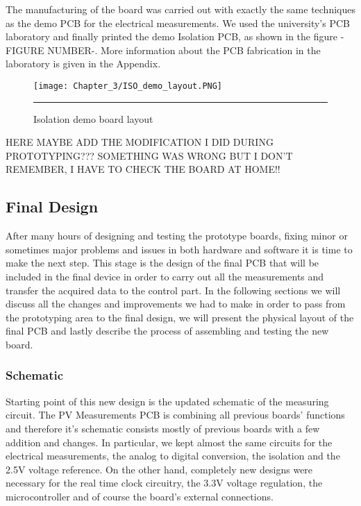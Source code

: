 The manufacturing of the board was carried out with exactly the same techniques as the demo PCB for the electrical measurements. We used the university's PCB laboratory and finally printed the demo Isolation PCB, as shown in the figure -FIGURE NUMBER-. More information about the PCB fabrication in the laboratory is given in the Appendix.\\

\begin{figure}[htbp]
	\centering
		\texttt{[image: Chapter\_3/ISO\_demo\_layout.PNG]}
		\rule{35em}{0.5pt}
	\caption{Isolation demo board layout}
	\label{fig:ISO_demo_layo}
\end{figure}

HERE MAYBE ADD THE MODIFICATION I DID DURING PROTOTYPING???
SOMETHING WAS WRONG BUT I DON'T REMEMBER, I HAVE TO CHECK THE BOARD AT HOME!!


\subsection{Final Design}
After many hours of designing and testing the prototype boards, fixing minor or sometimes major problems and issues in both hardware and software it is time to make the next step. This stage is the design of the final PCB that will be included in the final device in order to carry out all the measurements and transfer the acquired data to the control part. In the following sections we will discuss all the changes and improvements we had to make in order to pass from the prototyping area to the final design, we will present the physical layout of the final PCB and lastly describe the process of assembling and testing the new board.


\subsubsection{Schematic}
Starting point of this new design is the updated schematic of the measuring circuit. The PV Measurements PCB is combining all previous boards' functions and therefore it's schematic consists mostly of previous boards with a few addition and changes. In particular, we kept almost the same circuits for the electrical measurements, the analog to digital conversion, the isolation and the 2.5V voltage reference. On the other hand, completely new designs were necessary for the real time clock circuitry, the 3.3V voltage regulation, the microcontroller and of course the board's external connections.

